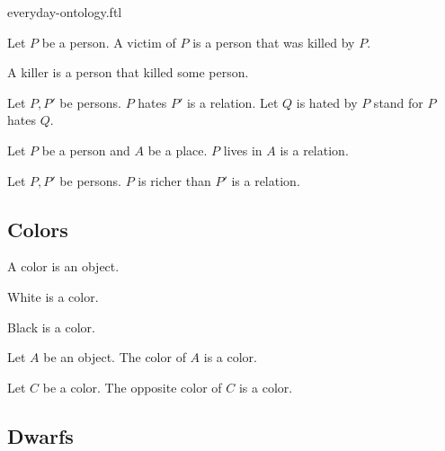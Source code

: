 \documentclass{article}
\begin{document}
\begin{smodule}{everyday-ontology.ftl}
\begin{definition*}[forthel]
  Let $P$ be a person.
  A victim of $P$ is a person that was killed by $P$.
\end{definition*}

\begin{definition*}[forthel]
  A killer is a person that killed some person.
\end{definition*}

\begin{signature*}[forthel]
  Let $P, P'$ be persons.
  $P$ hates $P'$ is a relation.
  Let $Q$ is hated by $P$ stand for $P$ hates $Q$.
\end{signature*}

\begin{signature*}[forthel]
  Let $P$ be a person and $A$ be a place.
  $P$ lives in $A$ is a relation.
\end{signature*}

\begin{signature*}[forthel]
  Let $P, P'$ be persons.
  $P$ is richer than $P'$ is a relation.
\end{signature*}


\subsection{Colors}

\begin{signature*}[forthel]
  A color is an object.
\end{signature*}

\begin{signature*}[forthel]
  White is a color.
\end{signature*}

\begin{signature*}[forthel]
  Black is a color.
\end{signature*}

\begin{signature*}[forthel]
  Let $A$ be an object.
  The color of $A$ is a color.
\end{signature*}

\begin{signature*}[forthel]
  Let $C$ be a color.
  The opposite color of $C$ is a color.
\end{signature*}


\subsection{Dwarfs}


\end{smodule}
\end{document}

